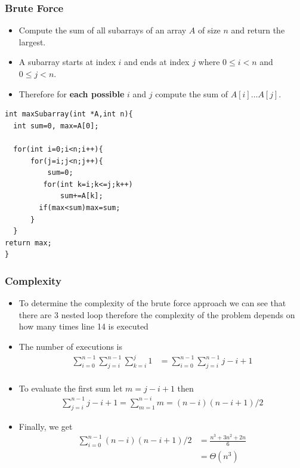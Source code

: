 \documentclass{beamer}
\begin{document}
\begin{frame}
  \frametitle{Brute Force}
  \begin{itemize}
  \item Compute the sum of all subarrays of an array $A$ of size $n$ and return the largest.
  \item A subarray starts at index $i$ and ends at index $j$ where
    $0\le i< n$ and $0\le j <n$.
\item Therefore for \textbf{each possible} $i$ and $j$ compute the sum
  of $A[i]\ldots A[j]$.
  \end{itemize}
\begin{lstlisting}[frame=none,numbers=none]
int maxSubarray(int *A,int n){
  int sum=0, max=A[0];

  for(int i=0;i<n;i++){
      for(j=i;j<n;j++){
          sum=0;
         for(int k=i;k<=j;k++)
             sum+=A[k];
        if(max<sum)max=sum;
      }
  }
return max;
}
\end{lstlisting}
\end{frame}


\begin{frame}
  \frametitle{Complexity}
  \begin{itemize}
  \item To determine the complexity of the brute force approach we can
    see that there are 3 nested loop therefore the complexity of the
    problem depends on how many times line 14 is executed
\item The number of executions is
  \begin{align*}
    \sum_{i=0}^{n-1}\sum_{j=i}^{n-1}\sum_{k=i}^{j}1&=\sum_{i=0}^{n-1}\sum_{j=i}^{n-1}j-i+1\\
  \end{align*}
\item To evaluate the first sum let $m=j-i+1$ then
  \begin{align*}
    \sum_{j=i}^{n-1}j-i+1=\sum_{m=1}^{n-i}m=(n-i)(n-i+1)/2
  \end{align*}
  \end{itemize}
\end{frame}

\begin{frame}
  \begin{itemize}
  \item Finally, we get
 \begin{align*}
    \sum_{i=0}^{n-1}(n-i)(n-i+1)/2 &=\frac{n^3+3n^2+2n}{6}\\
   &=\Theta(n^3)
  \end{align*}
  \end{itemize}
\end{frame}
\end{document}
